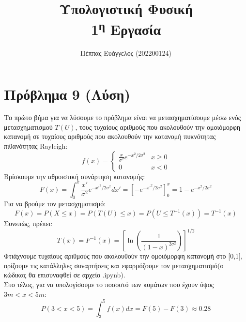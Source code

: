 \documentclass[12pt]{article}
\title{Υπολογιστική Φυσική \\ 1\textsuperscript{η} Εργασία}
\date{ }
\author{Πέππας Ευάγγελος (202200124)}
\begin{document}
\maketitle
\section*{Πρόβλημα 9 (Λύση)}
Το πρώτο βήμα για να λύσουμε το πρόβλημα είναι να μετασχηματίσουμε μέσω ενός μετασχηματισμού $T(U)$, τους τυχαίους αριθμούς που ακολουθούν την ομοιόμορφη κατανομή σε τυχαίους αριθμούς που ακολουθούν την κατανομή πυκνότητας πιθανότητας Rayleigh: \\
\[  f(x) = 
\begin{cases}
	\frac{x}{\sigma ^2} e^{-x^2/2\sigma^2} & x \geq 0 \\
	0 & x<0
\end{cases}
\]
Βρίσκουμε την αθροιστική συνάρτηση κατανομής: 
\[ F(x) = \int_0^x \frac{x'}{\sigma^2} e^{-x'^2/2\sigma^2}dx' = \left[-e^{-x'^2/2\sigma^2}\right]_0^x = 1 - e^{-x^2/2\sigma^2} \]
Για να βρούμε τον μετασχηματισμό: 
\[ F(x) = P(X\leq x) = P(T(U) \leq x) = P(U \leq T^{-1}(x)) = T^{-1}(x)\]
Συνεπώς, πρέπει: 
\[ T(x) = F^{-1}(x) = \left[\ln{\left(\frac{1}{(1-x)^{2\sigma^2}} \right)}\right]^{1/2} \]
Φτιάχνουμε τυχαίους αριθμούς που ακολουθούν την ομοιόμορφη κατανομή στο [0,1], ορίζουμε τις κατάλληλες συναρτήσεις και εφαρμόζουμε τον μετασχηματισμό(ο κώδικας θα επισυναφθεί σε αρχείο .ipynb). \\
Στο τέλος, για να υπολογίσουμε το ποσοστό των κυμάτων που έχουν ύψος $3m<x<5m$:
\[ P(3<x<5) = \int_3^5f(x)dx = F(5) - F(3) \approx 0.28 \]
\end{document}
